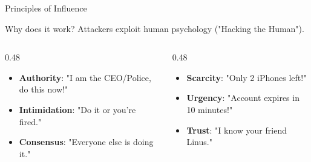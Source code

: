 \documentclass[aspectratio=169]{beamer}  %
\begin{document}
\begin{frame}{Principles of Influence}
    \begin{block}{Why does it work?}
        \footnotesize
        Attackers exploit human psychology ("Hacking the Human").
    \end{block}
    \vspace{0.2cm}
    \begin{columns}[T]
        \begin{column}{0.48\textwidth}
            \begin{itemize}
                \item \textbf{Authority}: "I am the CEO/Police, do this now!"
                \item \textbf{Intimidation}: "Do it or you're fired."
                \item \textbf{Consensus}: "Everyone else is doing it."
            \end{itemize}
        \end{column}
        \begin{column}{0.48\textwidth}
            \begin{itemize}
                \item \textbf{Scarcity}: "Only 2 iPhones left!"
                \item \textbf{Urgency}: "Account expires in 10 minutes!"
                \item \textbf{Trust}: "I know your friend Linus."
            \end{itemize}
        \end{column}
    \end{columns}
    \vspace{0.5cm}
    \begin{center}
    \end{center}
\end{frame}
\end{document}
